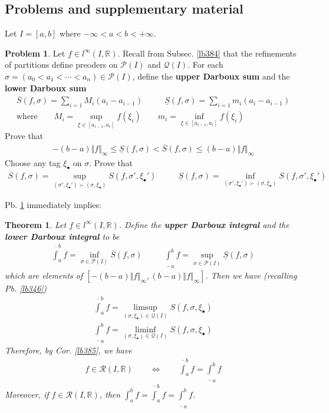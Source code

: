 \documentclass[12pt,b5paper,notitlepage]{article}
\theoremstyle{definition}
\newtheorem{prob}{\color{red}Problem}[section]
\theoremstyle{plain}
\newtheorem{thm}[df]{Theorem}
\newcommand{\mc}{\mathcal}
\newcommand{\ovl}{\overline}
\newcommand{\scr}{\mathscr}
\newcommand{\blt}{\bullet}
\newcommand{\Rbb}{\mathbb R}
\numberwithin{equation}{section}
\begin{document}
\subsection{Problems and supplementary material}


Let $I=[a,b]$ where $-\infty<a<b<+\infty$.



\begin{prob}\label{lb386}
Let $f\in l^\infty(I,\Rbb)$. Recall from Subsec. \ref{lb384} that the refinements of partitions define preoders on $\mc P(I)$ and $\mc Q(I)$. For each $\sigma=(a_0<a_1<\cdots<a_n)\in\mc P(I)$, define the \textbf{upper Darboux sum} and the \textbf{lower Darboux sum} 
\begin{gather*}
\ovl S(f,\sigma)=\sum_{i=1}M_i(a_i-a_{i-1})\qquad~~~ \underline S(f,\sigma)=\sum_{i=1}m_i(a_i-a_{i-1})\\
\text{where}\qquad M_i=\sup_{\xi\in[a_{i-1},a_i]}f(\xi_i)\qquad m_i=\inf_{\xi\in[a_{i-1},a_i]}f(\xi_i)
\end{gather*}
Prove that 
\begin{align*}
-(b-a)\Vert f\Vert_\infty\leq\underline S(f,\sigma)<\ovl S(f,\sigma)\leq (b-a)\Vert f\Vert_\infty
\end{align*}
Choose any tag $\xi_\blt$ on $\sigma$. Prove that
\begin{gather}
\ovl S(f,\sigma)=\sup_{(\sigma',\xi_\blt')\succ (\sigma,\xi_\blt)} S(f,\sigma',\xi_\blt')\qquad~~~ \underline S(f,\sigma)=\inf_{(\sigma',\xi_\blt')\succ (\sigma,\xi_\blt)} S(f,\sigma',\xi_\blt')
\end{gather}
\end{prob}


Pb. \ref{lb386} immediately implies:
\begin{thm}
Let $f\in l^\infty(I,\Rbb)$. Define the \textbf{upper Darboux integral} and the \textbf{lower Darboux integral}   to be
\begin{align*}
\ovl\int_a^b f=\inf_{\sigma\in\mc P(I)}\ovl S(f,\sigma)\qquad~~~\underline\int_a^b f=\sup_{\sigma\in\mc P(I)}\underline S(f,\sigma)
\end{align*}
which are elements of $[-(b-a)\Vert f\Vert_\infty,(b-a)\Vert f\Vert_\infty]$. Then we have (recalling Pb. \ref{lb346})
\begin{align*}
\ovl\int_a^b f=\limsup_{(\sigma,\xi_\blt)\in\mc Q(I)}S(f,\sigma,\xi_\blt)\\
\underline\int_a^b f=\liminf_{(\sigma,\xi_\blt)\in\mc Q(I)}S(f,\sigma,\xi_\blt)
\end{align*}
Therefore, by Cor. \ref{lb385}, we have 
\begin{align}
f\in\scr R(I,\Rbb)\qquad\Longleftrightarrow\qquad \ovl\int_a^bf=\underline\int_a^bf
\end{align}
Moreover, if $f\in\scr R(I,\Rbb)$, then $\int_a^b f=\ovl\int_a^bf=\underline\int_a^bf$.
\end{thm}
\end{document}
